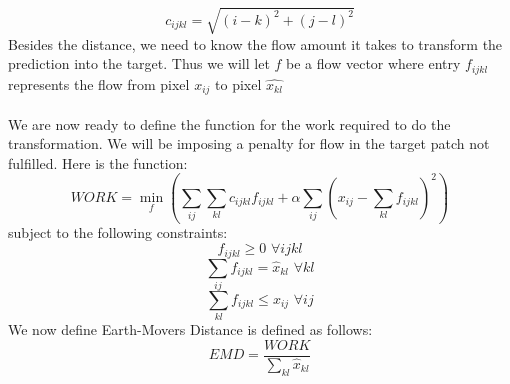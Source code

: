 \documentclass[twoside,11pt]{article}
\theoremstyle{definition}
\begin{document}
\[
c_{ijkl} = \sqrt{(i-k)^2 + (j-l)^2}
\]
Besides the distance, we need to know the flow amount it takes to transform the prediction into the target. Thus we will let $f$ be a flow vector where entry $f_{ijkl}$ represents the flow from pixel $x_{ij}$ to pixel $\hat{x_{kl}}$\\
\\
We are now ready to define the function for the work required to do the transformation. We will be imposing a penalty for flow in the target patch not fulfilled. Here is the function:
\[
WORK = \min_f(\sum_{ij}{\sum_{kl}{c_{ijkl} f_{ijkl}}} + \alpha \sum_{ij}{(x_{ij} - \sum_{kl}{f_{ijkl}})^2})
\]
subject to the following constraints:\\
\[
f_{ijkl} \geq 0 \, \, \forall ijkl
\]
\[
\sum_{ij}{f_{ijkl}} = \hat{x}_{kl} \, \, \forall kl
\]
\[
\sum_{kl}{f_{ijkl}} \leq x_{ij} \, \, \forall ij
\]
We now define Earth-Movers Distance is defined as follows:
\[
EMD = \frac{WORK}{\sum_{kl}{\hat{x}_{kl}}}
\]
\end{document}
